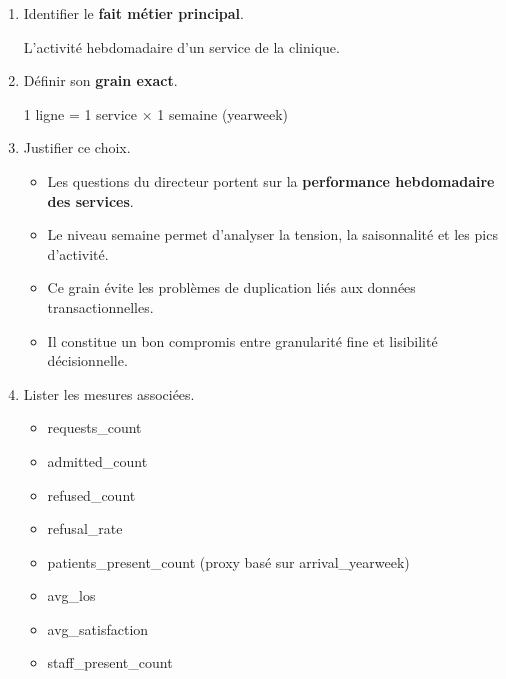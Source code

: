 \documentclass[11pt,a4paper]{article}
\begin{document}
\begin{enumerate}
  \item Identifier le \textbf{fait métier principal}.
    \begin{tcolorbox}[title=\textbf{Fait métier principal}, colback=gray!5, colframe=black, boxrule=0.8pt, arc=2mm]
    L’activité hebdomadaire d’un service de la clinique.
    \end{tcolorbox}
  \item Définir son \textbf{grain exact}.
    \begin{tcolorbox}[title=\textbf{Grain choisi}, colback=gray!5, colframe=black, boxrule=0.8pt, arc=2mm]
      \begin{center}
      1 ligne = 1 service × 1 semaine (yearweek)
      \end{center}
    \end{tcolorbox}
  \item Justifier ce choix.
    \begin{tcolorbox}[title=\textbf{Justification}, colback=gray!5, colframe=black, boxrule=0.8pt, arc=2mm]
    \begin{itemize}
    \item Les questions du directeur portent sur la \textbf{performance hebdomadaire des services}.
    \item Le niveau semaine permet d’analyser la tension, la saisonnalité et les pics d’activité.
    \item Ce grain évite les problèmes de duplication liés aux données transactionnelles.
    \item Il constitue un bon compromis entre granularité fine et lisibilité décisionnelle.
    \end{itemize}
    \end{tcolorbox}
  \item Lister les mesures associées.
    \begin{tcolorbox}[title=\textbf{Mesures associées}, colback=gray!5, colframe=black, boxrule=0.8pt, arc=2mm]
    \begin{itemize}
    \item requests\_count
    \item admitted\_count
    \item refused\_count
    \item refusal\_rate
    \item patients\_present\_count (proxy basé sur arrival\_yearweek)
    \item avg\_los
    \item avg\_satisfaction
    \item staff\_present\_count
    \end{itemize}
    \end{tcolorbox}
\end{enumerate}
\end{document}
